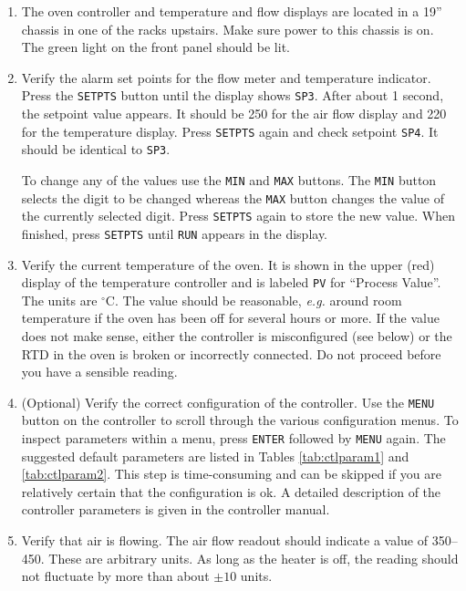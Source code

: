 {\begin{enumerate}
\item The oven controller and temperature and flow displays are located
  in a 19'' chassis in one of the racks upstairs. Make sure power to this
  chassis is on. The green light on the front panel should be lit.

\item Verify the alarm set points for the flow meter and
  temperature indicator. Press the {\tt SETPTS} button
  until the display shows {\tt SP3}. After about 1 second,
  the setpoint value appears. It should be 250 for the
  air flow display and 220 for the temperature display. Press
  {\tt SETPTS} again and check setpoint {\tt SP4}. It
  should be identical to {\tt SP3}.

  To change
  any of the values use the {\tt MIN} and {\tt MAX} buttons. The {\tt MIN}
  button selects the digit to be changed whereas the {\tt MAX}
  button changes the value of the currently selected digit.
  Press {\tt SETPTS} again to store the new value. 
  When finished, press {\tt SETPTS} until {\tt RUN} appears in the
  display.


\item Verify the current temperature of the oven. It is shown
  in the upper (red) display of the temperature controller
  and is labeled {\tt PV} for ``Process Value''. The units are $^\circ$C.
  The value should be reasonable,
  {\it e.g.}\/ around room temperature if the oven has been off
  for several hours or more. If the value does not make sense,
  either the controller is misconfigured (see below) or the RTD 
  in the oven is broken or incorrectly connected. 
  Do not proceed before you have a sensible reading.

\item (Optional) Verify the correct configuration of the controller.
  Use the {\tt MENU} button on the controller to scroll through
  the various configuration menus. To inspect parameters within
  a menu, press {\tt ENTER} followed by {\tt MENU} again. The suggested
  default parameters are listed in Tables \ref{tab:ctlparam1}
  and \ref{tab:ctlparam2}. This step
  is time-consuming and can be skipped if you are relatively certain
  that the configuration is ok. A detailed description of the 
  controller parameters is given in the controller manual.

\item Verify that air is flowing. The air flow readout should indicate
  a value of 350--450. These are arbitrary units. As long as the heater is
  off, the reading should not fluctuate by more than about $\pm 10$ units.


\end{enumerate}}
